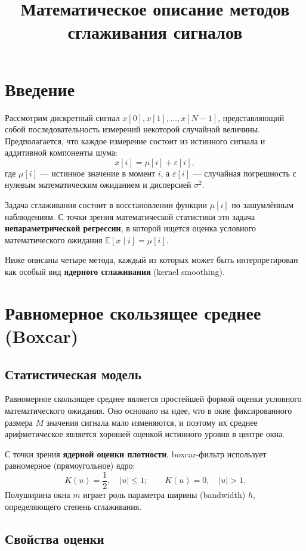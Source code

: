 \documentclass[12pt,a4paper]{article}
\title{\color{titleblue}\textbf{Математическое описание методов\\сглаживания сигналов}}
\author{}
\date{}
\begin{document}
\maketitle

\section{Введение}

Рассмотрим дискретный сигнал $x[0], x[1], \ldots, x[N{-}1]$, представляющий собой последовательность измерений некоторой случайной величины. Предполагается, что каждое измерение состоит из истинного сигнала и аддитивной компоненты шума:
\[
x[i] = \mu[i] + \varepsilon[i],
\]
где $\mu[i]$ --- истинное значение в момент $i$, а $\varepsilon[i]$ --- случайная погрешность с нулевым математическим ожиданием и дисперсией $\sigma^2$.

Задача сглаживания состоит в восстановлении функции $\mu[i]$ по зашумлённым наблюдениям. С точки зрения математической статистики это задача \textbf{непараметрической регрессии}, в которой ищется оценка условного математического ожидания $\mathbb{E}[x \mid i] = \mu[i]$.

Ниже описаны четыре метода, каждый из которых может быть интерпретирован как особый вид \textbf{ядерного сглаживания} (kernel smoothing).

\section{Равномерное скользящее среднее (Boxcar)}

\subsection{Статистическая модель}

Равномерное скользящее среднее является простейшей формой оценки условного математического ожидания. Оно основано на идее, что в окне фиксированного размера $M$ значения сигнала мало изменяются, и поэтому их среднее арифметическое является хорошей оценкой истинного уровня в центре окна.

С точки зрения \textbf{ядерной оценки плотности}, boxcar-фильтр использует равномерное (прямоугольное) ядро:
\[
K(u) = \frac{1}{2}, \quad |u| \leq 1; \qquad K(u) = 0, \quad |u| > 1.
\]
Полуширина окна $m$ играет роль параметра ширины (bandwidth) $h$, определяющего степень сглаживания.

\subsection{Свойства оценки}
\end{document}
